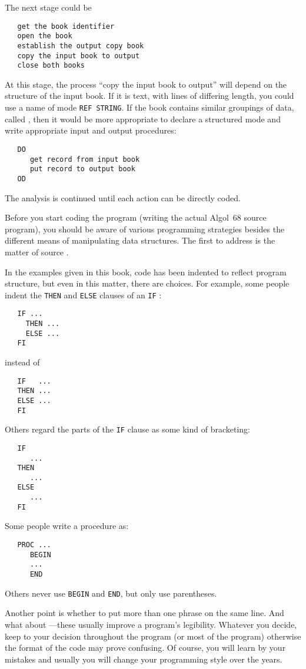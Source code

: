 The next stage could be
\begin{verbatim}
   get the book identifier
   open the book
   establish the output copy book
   copy the input book to output
   close both books
\end{verbatim}
\noindent
At this stage, the process ``copy the input book to output'' will
depend on the structure of the input book. If it is text, with lines
of differing length, you could use a name of mode \verb|REF STRING|.
If the book contains similar groupings of data, called
, then it would be more appropriate to
declare a structured mode and write appropriate input and output
procedures:
\begin{verbatim}
   DO
      get record from input book
      put record to output book
   OD
\end{verbatim}
\noindent
The analysis is continued until each action can be directly coded.

Before you start coding the program (writing the actual Algol~68
source program), you should be aware of various programming
strategies besides the different means of manipulating data
structures.  The first to address is the matter of source
.

In the examples given in this book, code has been indented to reflect
program structure, but even in this matter, there are choices. For
example, some people indent the \verb|THEN| and \verb|ELSE| clauses of
an \verb|IF| :
\begin{verbatim}
   IF ...
     THEN ...
     ELSE ...
   FI
\end{verbatim}
\noindent
instead of
\begin{verbatim}
   IF   ...
   THEN ...
   ELSE ...
   FI
\end{verbatim}
\noindent
Others regard the parts of the \verb|IF| clause as some kind of
bracketing:
\begin{verbatim}
   IF
      ...
   THEN
      ...
   ELSE
      ...
   FI
\end{verbatim}
\noindent
Some people write a procedure as:
\begin{verbatim}
   PROC ...
      BEGIN
      ...
      END
\end{verbatim}
\noindent
Others never use \verb|BEGIN| and \verb|END|, but only use parentheses.

Another point is whether to put more than one phrase on the same
line. And what about ---these usually
improve a program's legibility.  Whatever you decide, keep to your
decision throughout the program (or most of the program) otherwise the
format of the code may prove confusing.  Of course, you will learn by
your mistakes and usually you will change your programming style over
the years.

